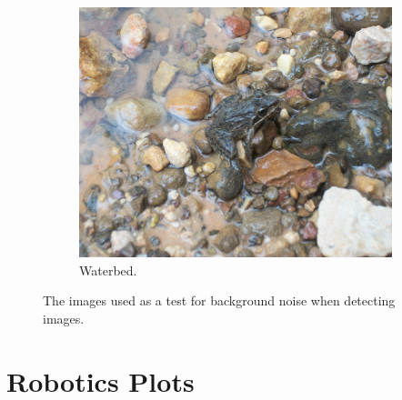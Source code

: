 \begin{figure}
  \begin{subfigure}{0.49\linewidth}    \includegraphics[width=\linewidth]{graphics/texture3} \caption{Waterbed.}         \label{fig:scene_waterb} \end{subfigure}
  \caption{The images used as a test for background noise when detecting images.}
  \label{fig:backgrounds}
\end{figure}










\section{Robotics Plots}
\label{app:roboticsPlots}

